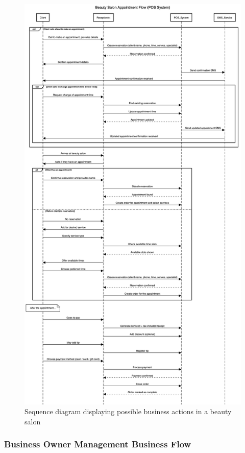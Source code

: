 \documentclass[11pt,a4paper,pdftex]{article}
\begin{document}
\begin{figure}[H]
    \centering
    \includegraphics[scale=0.22]{graphics/beauty salon.png}
    \caption{Sequence diagram displaying possible business actions in a beauty salon}
    \label{figures:sequence_beauty_salon}
\end{figure}


\subsubsection{Business Owner Management Business Flow}
\end{document}
